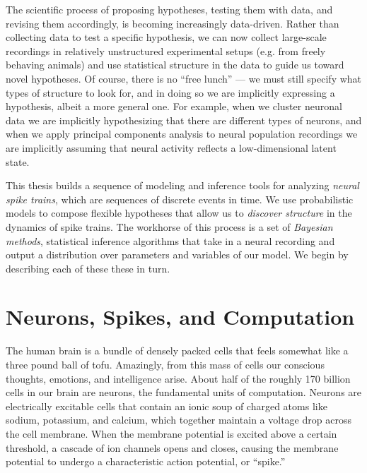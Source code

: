 The scientific process of proposing hypotheses, testing them with
data, and revising them accordingly, is becoming increasingly
data-driven.  Rather than collecting data to test a specific
hypothesis, we can now collect large-scale recordings in relatively
unstructured experimental setups (e.g. from freely behaving animals)
and use statistical structure in the data to guide us toward novel
hypotheses. Of course, there is no ``free lunch'' --- we must still
specify what types of structure to look for, and in doing so we are
implicitly expressing a hypothesis, albeit a more general one. For
example, when we cluster neuronal data we are implicitly hypothesizing
that there are different types of neurons, and when we apply principal
components analysis to neural population recordings we are implicitly
assuming that neural activity reflects a low-dimensional latent state.

This thesis builds a sequence of modeling and inference tools for
analyzing \emph{neural spike trains}, which are sequences of discrete
events in time. We use probabilistic models to compose flexible hypotheses
that allow us to \emph{discover structure} in the dynamics of spike trains.
The workhorse of this process is a set of \emph{Bayesian methods},
statistical inference algorithms that take in a neural recording and
output a distribution over parameters and variables of our model.
We begin by describing each of these these in turn.


\section{Neurons, Spikes, and Computation}
The human brain is a bundle of densely packed cells that feels
somewhat like a three pound ball of tofu. Amazingly, from this mass of
cells our conscious thoughts, emotions, and intelligence arise.  About
half of the roughly 170 billion cells in our brain are neurons, the
fundamental units of computation.  Neurons are electrically excitable
cells that contain an ionic soup of charged atoms like sodium,
potassium, and calcium, which together maintain a voltage drop across
the cell membrane. When the membrane potential is excited above a
certain threshold, a cascade of ion channels opens and closes, causing
the membrane potential to undergo a characteristic action potential,
or ``spike.''

